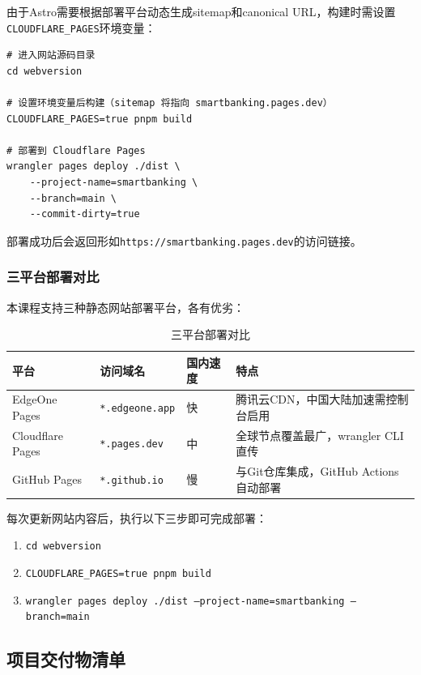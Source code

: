 由于Astro需要根据部署平台动态生成sitemap和canonical URL，构建时需设置\texttt{CLOUDFLARE\_PAGES}环境变量：

\begin{lstlisting}[style=shell]
# 进入网站源码目录
cd webversion

# 设置环境变量后构建（sitemap 将指向 smartbanking.pages.dev）
CLOUDFLARE_PAGES=true pnpm build

# 部署到 Cloudflare Pages
wrangler pages deploy ./dist \
    --project-name=smartbanking \
    --branch=main \
    --commit-dirty=true
\end{lstlisting}

部署成功后会返回形如\texttt{https://smartbanking.pages.dev}的访问链接。

\subsubsection*{三平台部署对比}

本课程支持三种静态网站部署平台，各有优劣：

\begin{table}[H]
\centering
\begin{tabular}{llll}
\toprule
\textbf{平台} & \textbf{访问域名} & \textbf{国内速度} & \textbf{特点} \\
\midrule
EdgeOne Pages & \texttt{*.edgeone.app} & 快 & 腾讯云CDN，中国大陆加速需控制台启用 \\
Cloudflare Pages & \texttt{*.pages.dev} & 中 & 全球节点覆盖最广，wrangler CLI直传 \\
GitHub Pages & \texttt{*.github.io} & 慢 & 与Git仓库集成，GitHub Actions自动部署 \\
\bottomrule
\end{tabular}
\caption{三平台部署对比}
\end{table}

\begin{notebox}[日常更新流程]
每次更新网站内容后，执行以下三步即可完成部署：
\begin{enumerate}
  \item \texttt{cd webversion}
  \item \texttt{CLOUDFLARE\_PAGES=true pnpm build}
  \item \texttt{wrangler pages deploy ./dist --project-name=smartbanking --branch=main}
\end{enumerate}
\end{notebox}

\subsection{项目交付物清单}


